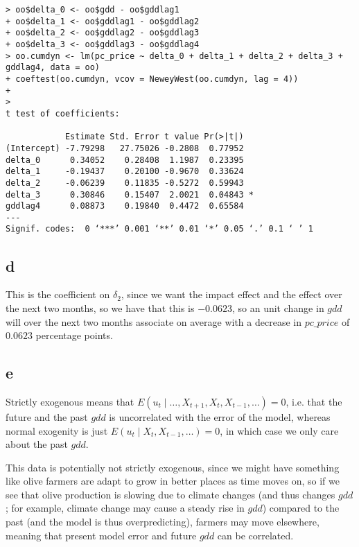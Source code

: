 \documentclass[12pt,letterpaper]{article}
\theoremstyle{definition}
\begin{document}
\begin{Verbatim}[fontsize=\small]
> oo$delta_0 <- oo$gdd - oo$gddlag1
+ oo$delta_1 <- oo$gddlag1 - oo$gddlag2
+ oo$delta_2 <- oo$gddlag2 - oo$gddlag3
+ oo$delta_3 <- oo$gddlag3 - oo$gddlag4
> oo.cumdyn <- lm(pc_price ~ delta_0 + delta_1 + delta_2 + delta_3 + gddlag4, data = oo)
+ coeftest(oo.cumdyn, vcov = NeweyWest(oo.cumdyn, lag = 4))
+
>
t test of coefficients:

            Estimate Std. Error t value Pr(>|t|)
(Intercept) -7.79298   27.75026 -0.2808  0.77952
delta_0      0.34052    0.28408  1.1987  0.23395
delta_1     -0.19437    0.20100 -0.9670  0.33624
delta_2     -0.06239    0.11835 -0.5272  0.59943
delta_3      0.30846    0.15407  2.0021  0.04843 *
gddlag4      0.08873    0.19840  0.4472  0.65584
---
Signif. codes:  0 ‘***’ 0.001 ‘**’ 0.01 ‘*’ 0.05 ‘.’ 0.1 ‘ ’ 1
\end{Verbatim}

\subsection*{d}

This is the coefficient on $\delta_{2}$, since we want the impact effect and the effect over the next two months, so we have that this is $-0.0623$, so an unit change in $gdd$ will over the next two months associate on average with a decrease in $pc\_price$ of $0.0623$ percentage points.

\subsection*{e}

Strictly exogenous means that $E(u_{t}\mid \dots, X_{t+1}, X_{t}, X_{t-1}, \dots) = 0$, i.e. that the future and the past $gdd$ is uncorrelated with the error of the model, whereas normal exogenity is just $E(u_{t} \mid X_{t}, X_{t-1}, \dots) = 0$, in which case we only care about the past $gdd$.

This data is potentially not strictly exogenous, since we might have something like olive farmers are adapt to grow in better places as time moves on, so if we see that olive production is slowing due to climate changes (and thus changes $gdd$; for example, climate change may cause a steady rise in $gdd$) compared to the past (and the model is thus overpredicting), farmers may move elsewhere, meaning that present model error and future $gdd$ can be correlated.
\end{document}
